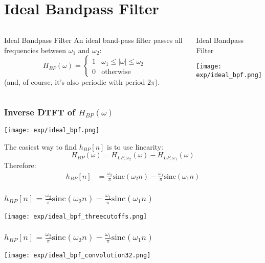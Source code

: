 \documentclass{beamer}
\begin{document}
\section[Ideal BPF]{Ideal Bandpass Filter}
\setcounter{subsection}{1}

\begin{frame}
  \begin{columns}
    \column{2.25in}
    \begin{block}{Ideal Bandpass Filter}
      An ideal band-pass filter passes all frequencies between $\omega_1$ and $\omega_2$:
      \[
      H_{BP}(\omega)
      = \begin{cases} 1& \omega_1\le |\omega|\le \omega_2\\
        0 & \mbox{otherwise}
      \end{cases}
      \]
      (and, of course, it's also periodic with period $2\pi$).
    \end{block}
    \column{2.25in}
    \begin{block}{Ideal Bandpass Filter}
      \centerline{\texttt{[image: exp/ideal\_bpf.png]}}
    \end{block}
  \end{columns}
\end{frame}


\begin{frame}
  \frametitle{Inverse DTFT of $H_{BP}(\omega)$}

  \centerline{\texttt{[image: exp/ideal\_bpf.png]}}
  
  The easiest way to find $h_{BP}[n]$ is to use linearity:
  \[
  H_{BP}(\omega) = H_{LP,\omega_2}(\omega) - H_{LP,\omega_1}(\omega)
  \]
  Therefore:
  \begin{align*}
    h_{BP}[n] &= \frac{\omega_2}{\pi}\mbox{sinc}(\omega_2 n)-\frac{\omega_1}{\pi}\mbox{sinc}(\omega_1 n)
  \end{align*}
\end{frame}

\begin{frame}
  \frametitle{$h_{BP}[n] = \frac{\omega_2}{\pi}\mbox{sinc}(\omega_2 n)-\frac{\omega_1}{\pi}\mbox{sinc}(\omega_1 n)$}

  \centerline{\texttt{[image: exp/ideal\_bpf\_threecutoffs.png]}}

\end{frame}


\begin{frame}
  \frametitle{$h_{BP}[n] = \frac{\omega_2}{\pi}\mbox{sinc}(\omega_2 n)-\frac{\omega_1}{\pi}\mbox{sinc}(\omega_1 n)$}

  \centerline{\texttt{[image: exp/ideal\_bpf\_convolution32.png]}}
\end{frame}
\end{document}
